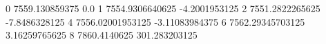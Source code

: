 0 7559.130859375 0.0
1 7554.9306640625 -4.2001953125
2 7551.2822265625 -7.8486328125
4 7556.02001953125 -3.11083984375
6 7562.29345703125 3.16259765625
8 7860.4140625 301.283203125
